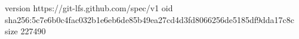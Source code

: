 version https://git-lfs.github.com/spec/v1
oid sha256:5c7e6b0c4fac032b1e6eb6de85b49ea27cd4d3fd8066256de5185df9dda17c8c
size 227490
